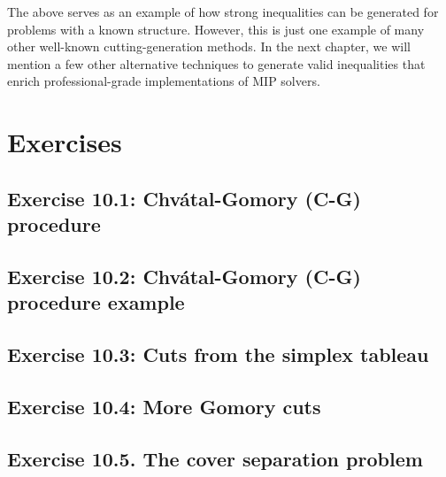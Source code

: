 The above serves as an example of how strong inequalities can be generated for problems with a known structure. However, this is just one example of many other well-known cutting-generation methods. In the next chapter, we will mention a few other alternative techniques to generate valid inequalities that enrich professional-grade implementations of MIP solvers. 


\vfill
\pagebreak


\section{Exercises}

\subsection*{Exercise 10.1: Chv\'atal-Gomory (C-G) procedure}


\subsection*{Exercise 10.2: Chv\'atal-Gomory (C-G) procedure example}


\subsection*{Exercise 10.3: Cuts from the simplex tableau}


\subsection*{Exercise 10.4: More Gomory cuts}


\subsection*{Exercise 10.5. The cover separation problem}




